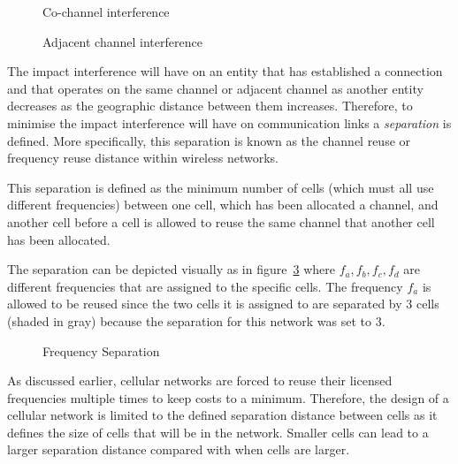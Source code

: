 \begin{figure}[H]
	\begin{centering}
	
	\caption{Co-channel interference}
	\label{fig:sameinterference}
	\end{centering}
\end{figure}
\begin{figure}[H]
	\begin{centering}
	
	\caption{Adjacent channel interference}
	\label{fig:adjacentinterference}
	\end{centering}
\end{figure}

The impact interference will have on an entity that has established a connection and that operates on the same channel or adjacent channel as another entity decreases as the geographic distance between them increases\cite{InterferenceOrientatedFAP}. Therefore, to minimise the impact interference will have on communication links a \emph{separation} is defined\cite{WirelessCommunications}. More specifically, this separation is known as the channel reuse or frequency reuse distance within wireless networks\cite{WirelessCommunications}.

This separation is defined as the minimum number of cells (which must all use different frequencies) between one cell, which has been allocated a channel, and another cell before a cell is allowed to reuse the same channel that another cell has been allocated\cite{WirelessCommunications,InterferenceOrientatedFAP}. 

The separation can be depicted visually as in figure~\ref{fig:seperationgraph} where $f_a,f_b,f_c,f_d$ are different frequencies that are assigned to the specific cells. The frequency $f_a$ is allowed to be reused since the two cells it is assigned to are separated by 3 cells (shaded in gray) because the separation for this network was set to 3.

\begin{figure}[H]
	\begin{centering}
	
	\caption{Frequency Separation}
	\label{fig:seperationgraph}
	\end{centering}
\end{figure}


As discussed earlier, cellular networks are forced to reuse their licensed frequencies multiple times to keep costs to a minimum. Therefore, the design of a cellular network is limited to the defined separation distance between cells as it defines the size of cells that will be in the network\cite{Eisenblatter,InterferenceOrientatedFAP}. Smaller cells can lead to a larger separation distance compared with when cells are larger\cite{WirelessCommunications,WirelessDigitalCommunications}.

